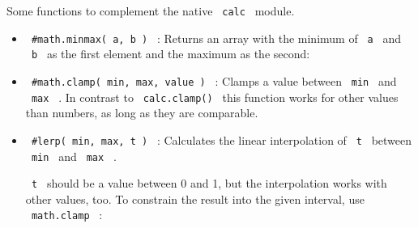 Some functions to complement the native \texttt{\ calc\ } module.

\begin{itemize}
\item
  \texttt{\ \#math.minmax(\ a,\ b\ )\ } : Returns an array with the
  minimum of \texttt{\ a\ } and \texttt{\ b\ } as the first element and
  the maximum as the second:

\begin{Shaded}
\begin{Highlighting}[]
\NormalTok{\#}\OperatorTok{,}\OperatorTok{=}\OperatorTok{,}
\end{Highlighting}
\end{Shaded}
\item
  \texttt{\ \#math.clamp(\ min,\ max,\ value\ )\ } : Clamps a value
  between \texttt{\ min\ } and \texttt{\ max\ } . In contrast to
  \texttt{\ calc.clamp()\ } this function works for other values than
  numbers, as long as they are comparable.

\begin{Shaded}
\begin{Highlighting}[]
\OperatorTok{{-}}\OperatorTok{=}\NormalTok{(}\OperatorTok{,} \OperatorTok{,}\OperatorTok{{-}}
\end{Highlighting}
\end{Shaded}
\item
  \texttt{\ \#lerp(\ min,\ max,\ t\ )\ } : Calculates the linear
  interpolation of \texttt{\ t\ } between \texttt{\ min\ } and
  \texttt{\ max\ } .

\begin{Shaded}
\begin{Highlighting}[]
\OperatorTok{=}\NormalTok{(}\OperatorTok{\%,} \OperatorTok{\%,}
\end{Highlighting}
\end{Shaded}

  \texttt{\ t\ } should be a value between 0 and 1, but the
  interpolation works with other values, too. To constrain the result
  into the given interval, use \texttt{\ math.clamp\ } :


\end{itemize}

